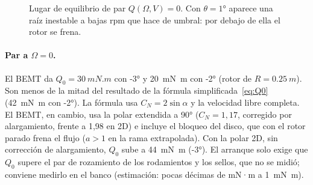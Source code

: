 \begin{figure}[H]
\centering
{}
\caption{Lugar de equilibrio de par $Q(\Omega,V)=0$. Con $\theta=\ang{+1}$ aparece una
raíz inestable a bajas rpm que hace de umbral: por debajo de ella el rotor se frena.}
\label{fig:bemt-locus}
\end{figure}

\paragraph{Par a $\Omega=0$.} El BEMT da $Q_0=\SI{30}{mN.m}$ con \ang{-3} y
\SI{20}{mN.m} con \ang{-2} (rotor de $R=\SI{0.25}{m}$). Son menos de la mitad del resultado
de la fórmula simplificada~\eqref{eq:Q0} (\SI{42}{mN.m} con \ang{-2}). La fórmula usa
$C_N=2\sin\alpha$ y la velocidad libre completa. El BEMT, en cambio, usa la polar
extendida a \ang{90} ($C_N=1{,}17$, corregido por alargamiento, frente a 1,98 en 2D) e incluye el
bloqueo del disco, que con el rotor parado frena el flujo ($a>1$ en la rama
extrapolada). Con la polar 2D, sin corrección de alargamiento, $Q_0$ sube a
\SI{44}{mN.m} (\ang{-3}). El arranque solo exige que $Q_0$ supere el par de rozamiento de los rodamientos y
los sellos, que no se midió; conviene medirlo en el banco (estimación: pocas décimas
de mN·m a \SI{1}{mN.m}).

